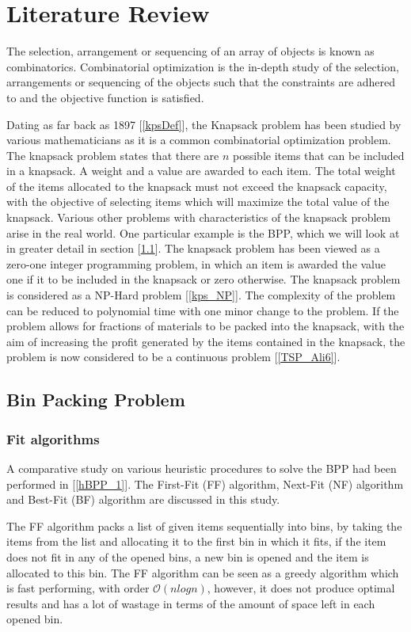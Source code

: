 \newpage
\section{Literature Review}
\begin{flushleft}
The  selection, arrangement or sequencing  of an array of objects is known as combinatorics. Combinatorial optimization is the in-depth study of the selection, arrangements or sequencing of the objects such that the constraints are adhered to and the objective function is satisfied.
\end{flushleft}
\begin{flushleft}
Dating as far back as 1897 [\ref{kpsDef}], the Knapsack problem has been studied by various mathematicians as it is a common combinatorial optimization problem. The knapsack problem states that there are $n$ possible items that can be included in a knapsack. A weight and a value are awarded to each item. The total weight of the items allocated to the knapsack must not exceed the knapsack capacity, with the objective of selecting items which will maximize the total value of the knapsack. Various other problems with characteristics of the knapsack problem arise in the real world. One particular example is the BPP,  which we will look at in greater detail in section [\ref{BPP_section}]. The knapsack problem has been viewed as a zero-one integer programming problem, in which an item is awarded the value one if it to be included in the knapsack or zero otherwise.  The knapsack problem is considered as a NP-Hard problem [\ref{kps_NP}]. The complexity of the problem can be reduced to polynomial time with one minor change to the problem. If the problem allows for fractions of materials to be packed into the knapsack, with the aim of increasing the profit generated by the items contained in the knapsack, the problem is now considered to be a continuous problem  [\ref{TSP_Ali6}].
\end{flushleft}
\subsection{Bin Packing Problem}\label{BPP_section}
\subsubsection{Fit algorithms}
\begin{flushleft}
A comparative study on various heuristic procedures to solve the BPP had been performed in [\ref{hBPP_1}]. The First-Fit (FF) algorithm, Next-Fit (NF) algorithm and Best-Fit (BF) algorithm are discussed in this study. 
\end{flushleft}
\begin{flushleft}
The FF algorithm packs a list of given items sequentially into bins, by taking the items from the list and allocating it to the first bin in which it fits, if the item does not fit in any of the opened bins, a new bin is opened and the item is allocated to this bin. The FF algorithm can be seen as a greedy algorithm which is fast performing, with order $\mathcal{O}(nlogn)$, however, it does not produce optimal results and has a lot of wastage in terms of the amount of space left in each opened bin.  
\end{flushleft}


